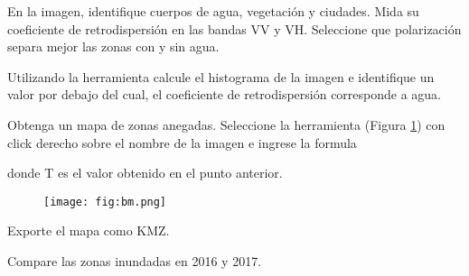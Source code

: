 \begin{que}
    En la imagen, identifique cuerpos de agua, vegetación y ciudades. Mida su coeficiente de retrodispersión en las bandas VV y VH. Seleccione que polarización separa mejor las zonas con y sin agua.
\end{que}

\begin{que}
    Utilizando la herramienta  calcule el histograma de la imagen e identifique un valor por debajo del cual, el coeficiente de retrodispersión corresponde a agua.
\end{que}

\begin{que}
    Obtenga un mapa de zonas anegadas. Seleccione la herramienta  (Figura \ref{fig:bm}) con click derecho sobre el nombre de la imagen e ingrese la formula
    \begin{center}
    \end{center}
    donde T es el valor obtenido en el punto anterior.
    \begin{figure}[h!]
        \centering
        \texttt{[image: fig:bm.png]}
        \caption{}
        \label{fig:bm}
    \end{figure}
\end{que}

\begin{que}
    Exporte el mapa como KMZ.
\end{que}


\begin{que}
    Compare las zonas inundadas en 2016 y 2017.
\end{que}
